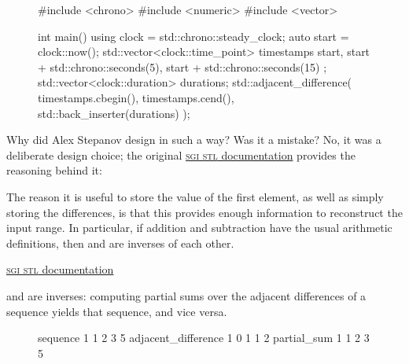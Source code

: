 \documentclass{article}
\begin{document}
\begin{figure}
\begin{code}
#include <chrono>
#include <numeric>
#include <vector>

int main() {
    using clock = std::chrono::steady_clock;
    auto start = clock::now();
    std::vector<clock::time_point> timestamps{
        start,
        start + std::chrono::seconds(5),
        start + std::chrono::seconds(15)
    };
    std::vector<clock::duration> durations;
    std::adjacent_difference(
        timestamps.cbegin(),
        timestamps.cend(),
        std::back_inserter(durations)
    );
}
\end{code}
\end{figure}

Why did Alex Stepanov design  in such a way?
Was it a mistake?
No, it was a deliberate design choice; the original \href{https://www.jmeiners.com/sgi-stl-docs/adjacent_difference.html#1}{\textsc{sgi stl} documentation} provides the reasoning behind it:
\epigraph{
  The reason it is useful to store the value of the first element, as well as simply storing the differences, is that this provides enough information to reconstruct the input range.
  In particular, if addition and subtraction have the usual arithmetic definitions, then \href{https://www.jmeiners.com/sgi-stl-docs/adjacent_difference.html}{} and \href{https://www.jmeiners.com/sgi-stl-docs/partial_sum.html}{} are inverses of each other.
}{\href{https://www.jmeiners.com/sgi-stl-docs/adjacent_difference.html#1}{\textsc{sgi stl} documentation}}

 and \href{http://www.en.cppreference.com/w/cpp/algorithm/partial_sum.html}{} are inverses:
computing partial sums over the adjacent differences of a sequence yields that sequence, and vice versa.

\begin{figure}
\begin{code}
           sequence   1  1  2  3  5
adjacent\_difference   1  0  1  1  2
        partial\_sum   1  1  2  3  5
\end{code}
\end{figure}
\end{document}
